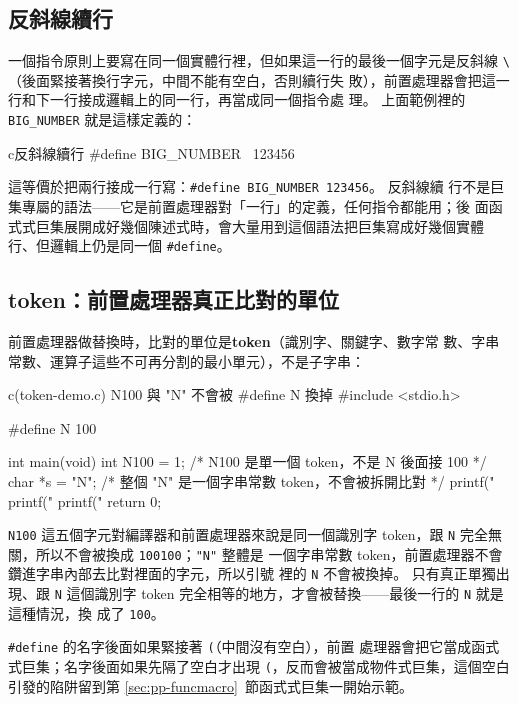 \subsection{反斜線續行}

一個指令原則上要寫在同一個實體行裡，但如果這一行的最後一個字元是反斜線
\texttt{\textbackslash}（後面緊接著換行字元，中間不能有空白，否則續行失
敗），前置處理器會把這一行和下一行接成邏輯上的同一行，再當成同一個指令處
理。 上面範例裡的 \texttt{BIG\_NUMBER} 就是這樣定義的：

\begin{code}{c}{反斜線續行}
#define BIG_NUMBER \
    123456
\end{code}

這等價於把兩行接成一行寫：\texttt{\#define BIG\_NUMBER 123456}。 反斜線續
行不是巨集專屬的語法——它是前置處理器對「一行」的定義，任何指令都能用；後
面函式式巨集展開成好幾個陳述式時，會大量用到這個語法把巨集寫成好幾個實體
行、但邏輯上仍是同一個 \texttt{\#define}。

\subsection{token：前置處理器真正比對的單位}

前置處理器做替換時，比對的單位是\textbf{token}（識別字、關鍵字、數字常
數、字串常數、運算子這些不可再分割的最小單元），不是子字串：

\begin{example}{c}{(token-demo.c) N100 與 "N" 不會被 \#define N 換掉}
#include <stdio.h>

#define N 100

int main(void) {
    int N100 = 1;       /* N100 是單一個 token，不是 N 後面接 100 */
    char *s = "N";       /* 整個 "N" 是一個字串常數 token，不會被拆開比對 */
    printf("%
    printf("%
    printf("%
    return 0;
}
\end{example}


\texttt{N100} 這五個字元對編譯器和前置處理器來說是同一個識別字 token，跟
\texttt{N} 完全無關，所以不會被換成 \texttt{100100}；\texttt{"N"} 整體是
一個字串常數 token，前置處理器不會鑽進字串內部去比對裡面的字元，所以引號
裡的 \texttt{N} 不會被換掉。 只有真正單獨出現、跟 \texttt{N} 這個識別字
token 完全相等的地方，才會被替換——最後一行的 \texttt{N} 就是這種情況，換
成了 \texttt{100}。

\texttt{\#define} 的名字後面如果緊接著 \texttt{(}（中間沒有空白），前置
處理器會把它當成函式式巨集；名字後面如果先隔了空白才出現
\texttt{(}，反而會被當成物件式巨集，這個空白引發的陷阱留到第
\ref{sec:pp-funcmacro}~節函式式巨集一開始示範。

